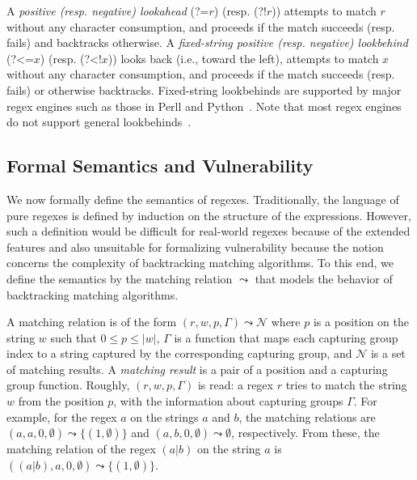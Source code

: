 \documentclass[conference]{IEEEtran}
\begin{document}
A {\em positive (resp. negative) lookahead} (?=$r$) (resp. (?!$r$)) attempts to match $r$ without any character consumption, and proceeds if the match succeeds (resp. fails) and backtracks otherwise.
A {\em fixed-string positive (resp. negative) lookbehind} (?\textless=$x$) (resp. (?\textless!$x$)) looks back (i.e., toward the left), attempts to match $x$ without any character consumption,
and proceeds if the match succeeds (resp. fails) or otherwise backtracks.
Fixed-string lookbehinds are supported by major regex engines such as those in {Perll} and Python~\cite{regexcookbook}.
Note that most regex engines do not support general lookbehinds~\cite{masteringregex}.


\subsection{Formal Semantics and Vulnerability}
\label{subsec:formalsemantics}

We now formally define the semantics of regexes.
Traditionally, the language of pure regexes is defined by
induction on the structure of the expressions.   However, such a definition would be difficult for real-world regexes because of the extended features and also unsuitable for formalizing vulnerability because the notion concerns the
complexity of backtracking matching algorithms.  To this end, we define the semantics by the matching relation ${\leadsto}$ that
models the behavior of backtracking matching algorithms.


A matching relation is of the form $(r, w, p, \Gamma) \leadsto{} \mathcal{N}$ where $p$ is a position on the string $w$ such that $0 \leq p \leq |w|$, $\Gamma$ is a function that maps each capturing group index to a string captured by the corresponding capturing group, and $\mathcal{N}$ is a set of matching results.  A {\em matching result} is a pair of a position and a capturing group function.
Roughly, $(r, w, p, \Gamma)$ is read:
a regex $r$ tries to match the string $w$ from the position $p$, with the information about capturing groups $\Gamma$.
For example, for the regex $a$ on the strings $a$ and $b$, the matching relations are $(a, a, 0, \emptyset{}) \leadsto{} \{ (1,\emptyset) \}$ and $(a, b, 0, \emptyset{}) \leadsto{} \emptyset{}$, respectively.
From these, the matching relation of the regex $(a|b)$ on the string $a$ is $((a|b), a, 0, \emptyset{}) \leadsto{} \{ (1,\emptyset) \}$.
\end{document}
